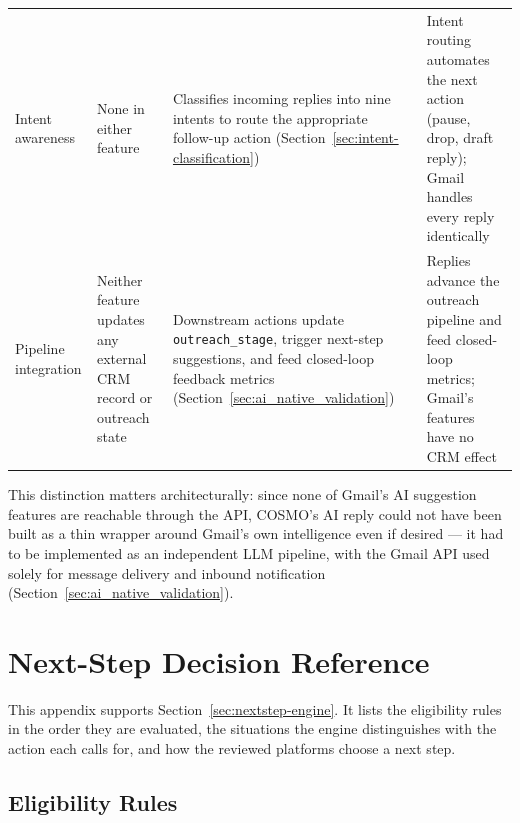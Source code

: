 \documentclass[a4paper]{article}
\begin{document}
\begin{table}[h]
\begin{tabularx}{\textwidth}{
  >{\raggedright\arraybackslash}p{1.9cm}
  >{\raggedright\arraybackslash}X
  >{\raggedright\arraybackslash}X
  >{\raggedright\arraybackslash}X}
Intent awareness &
None in either feature &
Classifies incoming replies into nine intents to route the appropriate follow-up action (Section~\ref{sec:intent-classification}) &
Intent routing automates the next action (pause, drop, draft reply); Gmail handles every reply identically \\
\addlinespace
Pipeline integration &
Neither feature updates any external CRM record or outreach state &
Downstream actions update \texttt{outreach\_stage}, trigger next-step suggestions, and feed closed-loop feedback metrics (Section~\ref{sec:ai_native_validation}) &
Replies advance the outreach pipeline and feed closed-loop metrics; Gmail's features have no CRM effect \\
\bottomrule
\end{tabularx}
\end{table}



This distinction matters architecturally: since none of Gmail's AI 
suggestion features are reachable through the API, COSMO's AI reply 
could not have been built as a thin wrapper around Gmail's own 
intelligence even if desired --- it had to be implemented as an 
independent LLM pipeline, with the Gmail API used solely for message 
delivery and inbound notification (Section~\ref{sec:ai_native_validation}).



\newpage
\section{Next-Step Decision Reference}
\label{app:nextstep}

This appendix supports Section~\ref{sec:nextstep-engine}. It lists the
eligibility rules in the order they are evaluated, the situations the
engine distinguishes with the action each calls for, and how the reviewed
platforms choose a next step.

\subsection{Eligibility Rules}
\end{document}
